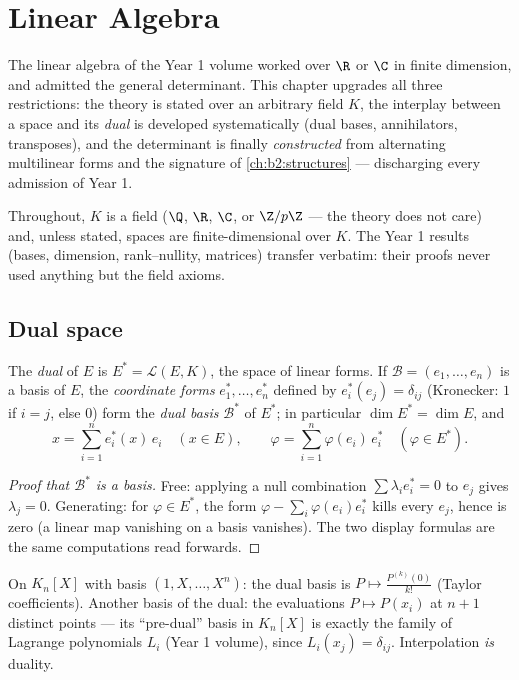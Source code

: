 \chapter{Linear Algebra}\label{ch:b2:linalg}

The linear algebra of the Year 1 volume worked over $\R$ or $\C$ in
finite dimension, and admitted the general determinant. This chapter
upgrades all three restrictions: the theory is stated over an
arbitrary field $K$, the interplay between a space and its
\emph{dual} is developed systematically (dual bases, annihilators,
transposes), and the determinant is finally \emph{constructed} from
alternating multilinear forms and the signature of
\cref{ch:b2:structures} --- discharging every admission of Year 1.

Throughout, $K$ is a field ($\Q$, $\R$, $\C$, or $\Z/p\Z$ --- the
theory does not care) and, unless stated, spaces are
finite-dimensional over $K$. The Year 1 results (bases, dimension,
rank--nullity, matrices) transfer verbatim: their proofs never used
anything but the field axioms.

\section{Dual space}

\begin{definition}\label{def:b2:linalg:dual}
The \emph{dual} of $E$ is $E^* = \mathcal{L}(E,
K)$, the space of linear forms. If $\mathcal{B} = (e_1, \dots, e_n)$
is a basis of $E$, the \emph{coordinate forms} $e_1^*, \dots, e_n^*$
defined by $e_i^*(e_j) = \delta_{ij}$ (Kronecker: $1$ if $i = j$,
else $0$) form the \emph{dual basis}
$\mathcal{B}^*$ of $E^*$; in particular $\dim E^* = \dim E$, and
\[
x = \sum_{i=1}^{n} e_i^*(x)\, e_i \quad (x \in E),
\qquad
\varphi = \sum_{i=1}^{n} \varphi(e_i)\, e_i^* \quad (\varphi \in
E^*).
\]
\end{definition}

\begin{proof}[Proof that $\mathcal{B}^*$ is a basis]
Free: applying a null combination $\sum \lambda_i e_i^* = 0$ to
$e_j$ gives $\lambda_j = 0$. Generating: for $\varphi \in E^*$, the
form $\varphi - \sum_i \varphi(e_i) e_i^*$ kills every $e_j$, hence
is zero (a linear map vanishing on a basis vanishes). The two
display formulas are the same computations read forwards.
\end{proof}

\begin{example}\label{ex:b2:linalg:dualexamples}
On $K_n[X]$ with basis $(1, X, \dots, X^n)$: the dual basis is $P
\mapsto \frac{P^{(k)}(0)}{k!}$ (Taylor coefficients). Another basis
of the dual: the evaluations $P \mapsto P(x_i)$ at $n + 1$ distinct
points --- its ``pre-dual'' basis in $K_n[X]$ is exactly the family
of Lagrange polynomials $L_i$ (Year 1 volume), since $L_i(x_j) =
\delta_{ij}$. Interpolation \emph{is} duality.
\end{example}

